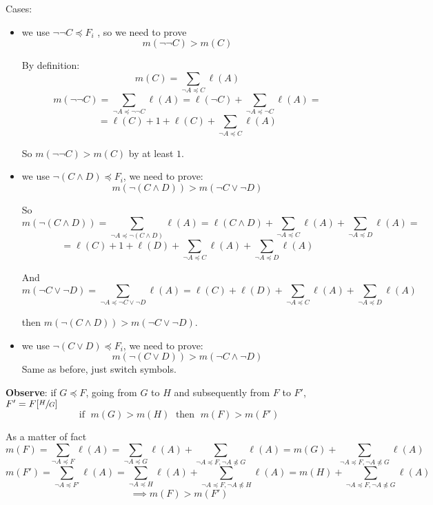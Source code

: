 \documentclass[11pt]{article}
\begin{document}
	Cases: 
	\begin{itemize}
		\item we use $\neg \neg C \preceq F_i$ , so we need to prove
		$$ m(\neg \neg C) > m(C) $$
		
		By definition: 
		$$ m(C) = \sum_{\neg A \preceq C} \ell(A) $$
		$$ m(\neg \neg C) = \sum_{\neg A \preceq \neg \neg C} \ell(A) = \ell (\neg C) + \sum_{\neg A \preceq \neg C} \ell (A) =$$ 
		$$ = \ell (C) + 1 + \ell (C) + \sum_{\neg A \preceq C} \ell (A) $$
		
		So $m(\neg \neg C) > m(C)$ by at least $1$.\\
		
		\newpage
		
		\item we use $\neg (C \wedge D) \preceq F_i$, we need to prove:
		$$ m(\neg (C \wedge D)) > m(\neg C \vee \neg D) $$
		
		So 
		$$ m(\neg (C \wedge D)) = \sum_{\neg A \preceq \neg (C \wedge D)} \ell(A) = \ell (C \wedge D) + \sum_{\neg A \preceq C} \ell(A) + \sum_{\neg A \preceq D} \ell(A) = $$
		$$ = \ell (C) + 1 + \ell (D) + \sum_{\neg A \preceq C} \ell(A) + \sum_{\neg A \preceq D} \ell(A) $$
		
		And 
		$$ m(\neg C \vee \neg D) = \sum_{\neg A \preceq \neg C \vee \neg D} \ell (A) = \ell (C) + \ell(D) + \sum_{\neg A \preceq C} \ell(A) + \sum_{\neg A \preceq D} \ell(A) $$
		
		then $m(\neg (C \wedge D)) > m(\neg C \vee \neg D)$.\\
		
		\item we use $\neg (C \vee D) \preceq F_i$, we need to prove:
		$$ m(\neg (C \vee D)) > m(\neg C \wedge \neg D) $$
		Same as before, just switch symbols.\\
		
	\end{itemize}
	
	\textbf{Observe}: if $G \preceq F$, going from $G$ to $H$ and subsequently from $F$ to $F'$, $F' = F[\sfrac{H}{G}]$
	$$ \text{if } \; m (G) > m(H) \; \text{ then } \; m(F) > m(F')$$
	
	As a matter of fact 
	$$m(F) = \sum_{\neg A \preceq F} \ell(A) = \sum_{\neg A \preceq G} \ell(A) + \sum_{\neg A \preceq F, \neg A \not \preceq G} \ell (A)  = m(G) + \sum_{\neg A \preceq F, \neg A \not \preceq G} \ell (A) $$
	$$ m(F') = \sum_{\neg A \preceq F'} \ell(A) = \sum_{\neg A \preceq H} \ell(A) + \sum_{\neg A \preceq F, \neg A \not \preceq H} \ell (A)  = m(H) + \sum_{\neg A \preceq F, \neg A \not \preceq G} \ell (A)$$
	$$ \implies m(F) > m(F') $$
	
\end{document}

